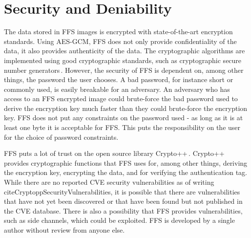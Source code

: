 \section{Security and Deniability}
The data stored in FFS images is encrypted with state-of-the-art encryption standards. Using AES-GCM, FFS does not only provide confidentiality of the data, it also provides authenticity of the data. The cryptographic algorithms are implemented using good cryptographic standards, such as cryptographic secure number generators\,\cite{RandomNumberGeneratorCryptoWiki2021}. However, the security of FFS is dependent on, among other things, the password the user chooses. A bad password, for instance short or commonly used, is easily breakable for an adversary. An adversary who has access to an FFS encrypted image could brute-force the bad password used to derive the encryption key much faster than they could brute-force the encryption key. FFS does not put any constraints on the password used - as long as it is at least one byte it is acceptable for FFS. This puts the responsibility on the user for the choice of password constraints. 

FFS puts a lot of trust on the open source library Crypto++\,\cite{CryptoLibraryFree}. Crypto++ provides cryptographic functions that FFS uses for, among other things, deriving the encryption key, encrypting the data, and for verifying the authentication tag. While there are no reported CVE security vulnerabilities as of writing\,cite{CryptoppSecurityVulnerabilities}, it is possible that there are vulnerabilities that have not yet been discovered or that have been found but not published in the CVE database. There is also a possibility that FFS provides vulnerabilities, such as side channels, which could be exploited. FFS is developed by a single author without review from anyone else.


